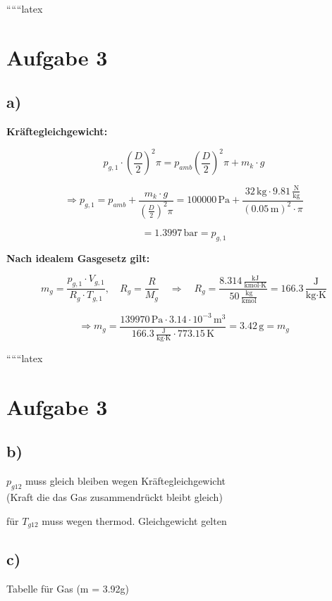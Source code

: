 
``````latex


\section*{Aufgabe 3}

\subsection*{a)}

\textbf{Kräftegleichgewicht:}

\[
p_{g,1} \cdot \left(\frac{D}{2}\right)^2 \pi = p_{amb} \left(\frac{D}{2}\right)^2 \pi + m_k \cdot g
\]

\[
\Rightarrow p_{g,1} = p_{amb} + \frac{m_k \cdot g}{\left(\frac{D}{2}\right)^2 \pi} = 100000 \, \text{Pa} + \frac{32 \, \text{kg} \cdot 9.81 \, \frac{\text{N}}{\text{kg}}}{(0.05 \, \text{m})^2 \cdot \pi}
\]

\[
= \boxed{1.3997 \, \text{bar} = p_{g,1}}
\]

\textbf{Nach idealem Gasgesetz gilt:}

\[
m_g = \frac{p_{g,1} \cdot V_{g,1}}{R_g \cdot T_{g,1}}, \quad R_g = \frac{R}{M_g} \quad \Rightarrow \quad R_g = \frac{8.314 \, \frac{\text{kJ}}{\text{kmol} \cdot \text{K}}}{50 \, \frac{\text{kg}}{\text{kmol}}} = 166.3 \, \frac{\text{J}}{\text{kg} \cdot \text{K}}
\]

\[
\Rightarrow m_g = \frac{139970 \, \text{Pa} \cdot 3.14 \cdot 10^{-3} \, \text{m}^3}{166.3 \, \frac{\text{J}}{\text{kg} \cdot \text{K}} \cdot 773.15 \, \text{K}} = \boxed{3.42 \, \text{g} = m_g}
\]

``````latex


\section*{Aufgabe 3}

\subsection*{b)}
$p_{g12}$ muss gleich bleiben wegen Kräftegleichgewicht \\
(Kraft die das Gas zusammendrückt bleibt gleich)

für $T_{g12}$ muss wegen thermod. Gleichgewicht gelten

\subsection*{c)}
Tabelle für Gas (m = 3.92g)

